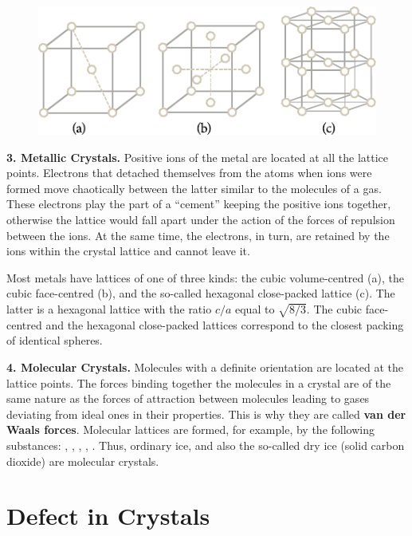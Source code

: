 \begin{figure}[t]
	\begin{center}
		\includegraphics[scale=1.0]{figures/ch_13/fig_13_7.pdf}
		\caption[]{}
		\label{fig:13_7}
	\end{center}
	\vspace{-0.8cm}
\end{figure}

\textbf{3. Metallic Crystals.} Positive ions of the metal are located at all the lattice points. Electrons that detached themselves from the atoms when ions were formed move chaotically between the latter similar to the molecules of a gas. These electrons play the part of a ``cement'' keeping the positive ions together, otherwise the lattice would fall apart under the action of the forces of repulsion between the ions. At the same time, the electrons, in turn, are retained by the ions within the crystal lattice and cannot leave it.

Most metals have lattices of one of three kinds: the cubic volume-centred (a), the cubic face-centred (b), and the so-called hexagonal close-packed lattice (c). The latter is a hexagonal lattice with the ratio $c/a$ equal to $\sqrt{8/3}$. The cubic face-centred and the hexagonal close-packed lattices correspond to the closest packing of identical spheres.

\textbf{4. Molecular Crystals.} Molecules with a definite orientation are located at the lattice points. The forces binding together the molecules in a crystal are of the same nature as the forces of attraction between molecules leading to gases deviating from ideal ones in their properties. This is why they are called \textbf{van der Waals forces}. Molecular lattices are formed, for example, by the following substances: , , , , . Thus, ordinary ice, and also the so-called dry ice (solid carbon dioxide) are molecular crystals.

\section{Defect in Crystals}\label{sec:13_4}


